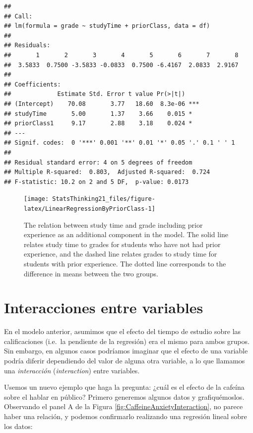 \documentclass[
  12pt,
]{book}
\begin{document}
\begin{verbatim}
## 
## Call:
## lm(formula = grade ~ studyTime + priorClass, data = df)
## 
## Residuals:
##       1       2       3       4       5       6       7       8 
##  3.5833  0.7500 -3.5833 -0.0833  0.7500 -6.4167  2.0833  2.9167 
## 
## Coefficients:
##             Estimate Std. Error t value Pr(>|t|)    
## (Intercept)    70.08       3.77   18.60  8.3e-06 ***
## studyTime       5.00       1.37    3.66    0.015 *  
## priorClass1     9.17       2.88    3.18    0.024 *  
## ---
## Signif. codes:  0 '***' 0.001 '**' 0.01 '*' 0.05 '.' 0.1 ' ' 1
## 
## Residual standard error: 4 on 5 degrees of freedom
## Multiple R-squared:  0.803,  Adjusted R-squared:  0.724 
## F-statistic: 10.2 on 2 and 5 DF,  p-value: 0.0173
\end{verbatim}

\begin{figure}
\texttt{[image: StatsThinking21\_files/figure-latex/LinearRegressionByPriorClass-1]} \caption{The relation between study time and grade including prior experience as an additional component in the model.  The solid line relates study time to grades for students who have not had prior experience, and the dashed line relates grades to study time for students with prior experience. The dotted line corresponds to the difference in means between the two groups.}\label{fig:LinearRegressionByPriorClass}
\end{figure}

\hypertarget{interacciones-entre-variables}{%
\section{Interacciones entre variables}\label{interacciones-entre-variables}}

En el modelo anterior, asumimos que el efecto del tiempo de estudio sobre las calificaciones (i.e.~la pendiente de la regresión) era el mismo para ambos grupos. Sin embargo, en algunos casos podríamos imaginar que el efecto de una variable podría diferir dependiendo del valor de alguna otra variable, a lo que llamamos una \emph{interacción} (\emph{interaction}) entre variables.

Usemos un nuevo ejemplo que haga la pregunta: ¿cuál es el efecto de la cafeína sobre el hablar en público? Primero generemos algunos datos y grafiquémoslos.
Observando el panel A de la Figura \ref{fig:CaffeineAnxietyInteraction}, no parece haber una relación, y podemos confirmarlo realizando una regresión lineal sobre los datos:
\end{document}
